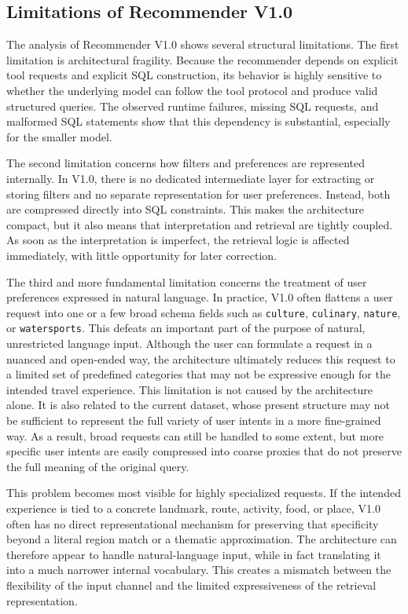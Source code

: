 \subsection{Limitations of Recommender V1.0}\label{subsection:recommendation-generation:recommender-v1-0-limitations}

The analysis of Recommender V1.0 shows several structural limitations. The first limitation is architectural fragility. Because the recommender depends on explicit tool requests and explicit SQL construction, its behavior is highly sensitive to whether the underlying model can follow the tool protocol and produce valid structured queries. The observed runtime failures, missing SQL requests, and malformed SQL statements show that this dependency is substantial, especially for the smaller model.

The second limitation concerns how filters and preferences are represented internally. In V1.0, there is no dedicated intermediate layer for extracting or storing filters and no separate representation for user preferences. Instead, both are compressed directly into SQL constraints. This makes the architecture compact, but it also means that interpretation and retrieval are tightly coupled. As soon as the interpretation is imperfect, the retrieval logic is affected immediately, with little opportunity for later correction.

The third and more fundamental limitation concerns the treatment of user preferences expressed in natural language. In practice, V1.0 often flattens a user request into one or a few broad schema fields such as \texttt{culture}, \texttt{culinary}, \texttt{nature}, or \texttt{watersports}. This defeats an important part of the purpose of natural, unrestricted language input. Although the user can formulate a request in a nuanced and open-ended way, the architecture ultimately reduces this request to a limited set of predefined categories that may not be expressive enough for the intended travel experience. This limitation is not caused by the architecture alone. It is also related to the current dataset, whose present structure may not be sufficient to represent the full variety of user intents in a more fine-grained way. As a result, broad requests can still be handled to some extent, but more specific user intents are easily compressed into coarse proxies that do not preserve the full meaning of the original query.

This problem becomes most visible for highly specialized requests. If the intended experience is tied to a concrete landmark, route, activity, food, or place, V1.0 often has no direct representational mechanism for preserving that specificity beyond a literal region match or a thematic approximation. The architecture can therefore appear to handle natural-language input, while in fact translating it into a much narrower internal vocabulary. This creates a mismatch between the flexibility of the input channel and the limited expressiveness of the retrieval representation.

